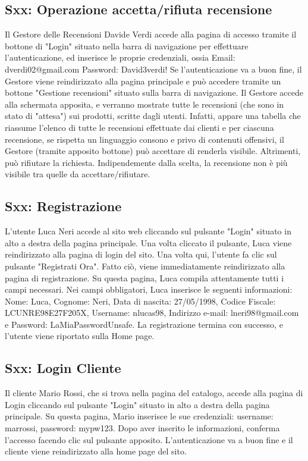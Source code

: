 \documentclass[12pt, a4paper, oneside]{book}
\begin{document}
    \subsection*{Sxx: Operazione accetta/rifiuta recensione}
    Il Gestore delle Recensioni Davide Verdi accede alla pagina di accesso tramite il bottone di "Login" situato nella barra di navigazione per effettuare l'autenticazione, ed inserisce le proprie credenziali, ossia Email: dverdi02@gmail.com Password: David3verdi!
    Se l'autenticazione va a buon fine, il Gestore viene reindirizzato alla pagina principale e può accedere tramite un bottone "Gestione recensioni" situato sulla barra di navigazione.
    Il Gestore accede alla schermata apposita, e verranno mostrate tutte le recensioni (che sono in stato di "attesa") sui prodotti, scritte dagli utenti. Infatti, appare una tabella che riassume l'elenco di tutte le recensioni effettuate dai clienti e per ciascuna recensione, se rispetta un linguaggio consono e privo di contenuti offensivi, il Gestore (tramite apposito bottone) può accettare di renderla visibile. Altrimenti, può rifiutare la richiesta.
    Indipendemente dalla scelta, la recensione non è più visibile tra quelle da accettare/rifiutare.


    \subsection*{Sxx: Registrazione}
     L'utente Luca Neri accede al sito web cliccando sul pulsante "Login" situato in alto a destra della pagina principale.
     Una volta cliccato il pulsante, Luca viene reindirizzato alla pagina di login del sito.
     Una volta qui, l'utente fa clic sul pulsante "Registrati Ora". Fatto ciò, viene immediatamente reindirizzato alla pagina di registrazione.
     Su questa pagina, Luca compila attentamente tutti i campi necessari. Nei campi obbligatori, Luca inserisce le seguenti informazioni:
     Nome: Luca, Cognome: Neri, Data di nascita: 27/05/1998, Codice Fiscale: LCUNRE98E27F205X,
      Username: nlucas98, Indirizzo e-mail: lneri98@gmail.com e Password: LaMiaPasswordUnsafe.
     La registrazione termina con successo, e l’utente viene riportato sulla Home page.

    \subsection*{Sxx: Login Cliente}
    Il cliente Mario Rossi, che si trova nella pagina del catalogo, accede alla pagina di Login cliccando sul pulsante "Login"
    situato in alto a destra della pagina principale.
    Su questa pagina, Mario inserisce le sue credenziali: username: marrossi, password: mypw123.
    Dopo aver inserito le informazioni, conferma l'accesso facendo clic sul pulsante apposito.
    L'autenticazione va a buon fine e il cliente viene reindirizzato alla home page del sito.
\end{document}
